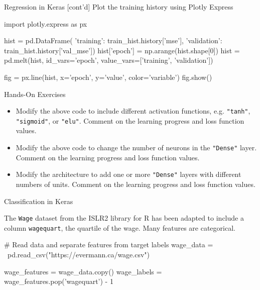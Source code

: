 \documentclass[ignorenonframetext,xcolor=x11names]{beamer}
\begin{document}
\begin{frame}[fragile]{Regression in Keras \small [cont'd]}
Plot the training history using Plotly Express
\begin{pythoncode}
import plotly.express as px

hist = pd.DataFrame({
    'training': train_hist.history['mse'],
    'validation': train_hist.history['val_mse']})
hist['epoch'] = np.arange(hist.shape[0])
hist = pd.melt(hist, 
               id_vars='epoch', 
               value_vars=['training', 'validation'])

fig = px.line(hist, x='epoch', y='value', 
                    color='variable')
fig.show()
\end{pythoncode}
\end{frame}

\begin{frame}{Hands-On Exercises}
\begin{itemize}
  \item Modify the above code to include different activation functions, e.g. \texttt{"tanh"}, \texttt{"sigmoid"}, or \texttt{"elu"}. Comment on the learning progress and loss function values.
  \item Modify the above code to change the number of neurons in the \texttt{"Dense"} layer. Comment on the learning progress and loss function values.
  \item Modify the architecture to add one or more \texttt{"Dense"} layers with different numbers of units. Comment on the learning progress and loss function values.
\end{itemize}
\end{frame}


\begin{frame}[fragile]{Classification in Keras}

The \texttt{Wage} dataset from the ISLR2 library for R has been adapted to include a column \texttt{wagequart}, the quartile of the wage. Many features are categorical.

\begin{pythoncode}
# Read data and separate features from target labels
wage_data = \
    pd.read_csv("https://evermann.ca/wage.csv")
    
wage_features = wage_data.copy()
wage_labels = wage_features.pop('wagequart') - 1
\end{pythoncode}
\end{frame}
\end{document}
